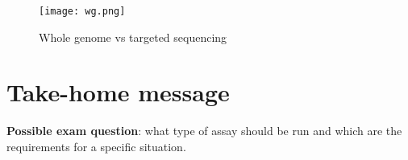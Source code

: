 \begin{figure}[H]
    \texttt{[image: wg.png]}
    \caption{\label{fig:wg}Whole genome vs targeted sequencing}
\end{figure}


\section{Take-home message}
\textbf{Possible exam question}: what type of assay should be run and which are the requirements for a specific situation.\\

